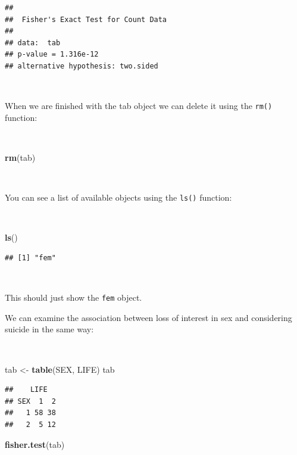 \documentclass[12pt,a4paper]{book}
\newenvironment{Shaded}{\begin{snugshade}}{\end{snugshade}}
\newcommand{\KeywordTok}[1]{\textcolor[rgb]{0.13,0.29,0.53}{\textbf{#1}}}
\newcommand{\NormalTok}[1]{#1}
\newcommand{\StringTok}[1]{\textcolor[rgb]{0.31,0.60,0.02}{#1}}
\theoremstyle{definition}
\theoremstyle{definition}
\theoremstyle{definition}
\theoremstyle{remark}
\begin{document}
\begin{verbatim}
## 
##  Fisher's Exact Test for Count Data
## 
## data:  tab
## p-value = 1.316e-12
## alternative hypothesis: two.sided
\end{verbatim}

~

When we are finished with the tab object we can delete it using the
\texttt{rm()} function:

~

\begin{Shaded}
\begin{Highlighting}[]
\KeywordTok{rm}\NormalTok{(tab)}
\end{Highlighting}
\end{Shaded}

~

You can see a list of available objects using the \texttt{ls()}
function:

~

\begin{Shaded}
\begin{Highlighting}[]
\KeywordTok{ls}\NormalTok{()}
\end{Highlighting}
\end{Shaded}

\begin{verbatim}
## [1] "fem"
\end{verbatim}

~

This should just show the \texttt{fem} object.

We can examine the association between loss of interest in sex and
considering suicide in the same way:

~

\begin{Shaded}
\begin{Highlighting}[]
\NormalTok{tab <-}\StringTok{ }\KeywordTok{table}\NormalTok{(SEX, LIFE)}
\NormalTok{tab}
\end{Highlighting}
\end{Shaded}

\begin{verbatim}
##    LIFE
## SEX  1  2
##   1 58 38
##   2  5 12
\end{verbatim}

\begin{Shaded}
\begin{Highlighting}[]
\KeywordTok{fisher.test}\NormalTok{(tab)}
\end{Highlighting}
\end{Shaded}
\end{document}
